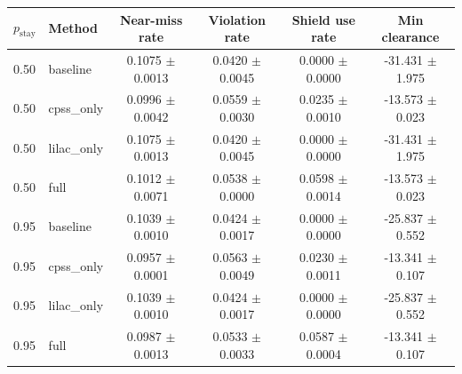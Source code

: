 \begin{tabular}{llcccc}
\toprule
$p_{\mathrm{stay}}$ & Method & Near-miss rate & Violation rate & Shield use rate & Min clearance \\
\midrule
0.50 & baseline & 0.1075 $\pm$ 0.0013 & 0.0420 $\pm$ 0.0045 & 0.0000 $\pm$ 0.0000 & -31.431 $\pm$ 1.975 \\
0.50 & cpss_only & 0.0996 $\pm$ 0.0042 & 0.0559 $\pm$ 0.0030 & 0.0235 $\pm$ 0.0010 & -13.573 $\pm$ 0.023 \\
0.50 & lilac_only & 0.1075 $\pm$ 0.0013 & 0.0420 $\pm$ 0.0045 & 0.0000 $\pm$ 0.0000 & -31.431 $\pm$ 1.975 \\
0.50 & full & 0.1012 $\pm$ 0.0071 & 0.0538 $\pm$ 0.0000 & 0.0598 $\pm$ 0.0014 & -13.573 $\pm$ 0.023 \\
0.95 & baseline & 0.1039 $\pm$ 0.0010 & 0.0424 $\pm$ 0.0017 & 0.0000 $\pm$ 0.0000 & -25.837 $\pm$ 0.552 \\
0.95 & cpss_only & 0.0957 $\pm$ 0.0001 & 0.0563 $\pm$ 0.0049 & 0.0230 $\pm$ 0.0011 & -13.341 $\pm$ 0.107 \\
0.95 & lilac_only & 0.1039 $\pm$ 0.0010 & 0.0424 $\pm$ 0.0017 & 0.0000 $\pm$ 0.0000 & -25.837 $\pm$ 0.552 \\
0.95 & full & 0.0987 $\pm$ 0.0013 & 0.0533 $\pm$ 0.0033 & 0.0587 $\pm$ 0.0004 & -13.341 $\pm$ 0.107 \\
\bottomrule
\end{tabular}